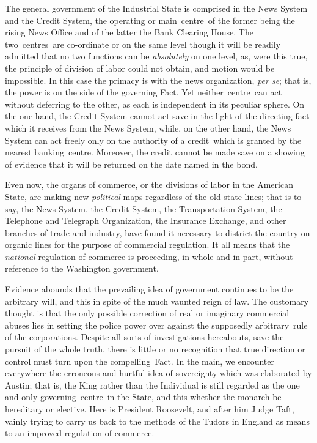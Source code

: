 \documentclass[twoside,symmetric,nobib,justified]{tufte-book}
\begin{document}
The general government of the Industrial State is comprised in the News
System and the Credit System, the operating or main~centre~of the former
being the rising News Office and of the latter the Bank Clearing House.
The two~centres~are co-ordinate or on the same level though it will be
readily admitted that no two functions can be \emph{absolutely} on one
level, as, were this true, the principle of division of labor could not
obtain, and motion would be impossible. In this case the primacy is with
the news organization, \emph{per se}; that is, the power is on the side
of the governing Fact. Yet neither~centre~can act without deferring to
the other, as each is independent in its peculiar sphere. On the one
hand, the Credit System cannot act save in the light of the directing
fact which it receives from the News System, while, on the other hand,
the News System can act freely only on the authority of a credit~which
is granted by the nearest banking~centre. Moreover, the credit cannot be
made save on a showing of evidence that it will be returned on the date
named in the bond.~

Even now, the organs of commerce, or the divisions of labor in the
American State, are making new \emph{political} maps regardless of the
old state lines; that is to say, the News System, the Credit System, the
Transportation System, the Telephone and Telegraph Organization, the
Insurance Exchange, and other branches of trade and industry, have found
it necessary to district the country on organic lines for the purpose of
commercial regulation. It all means that the \emph{national} regulation
of commerce is proceeding, in whole and in part, without reference to
the Washington government.~

Evidence abounds that the prevailing idea of government continues to be
the arbitrary will, and this in spite of the much vaunted reign of law.
The customary thought is that the only possible correction of real or
imaginary commercial abuses lies in setting the police power over
against the supposedly arbitrary~rule of the corporations. Despite all
sorts of investigations hereabouts, save the pursuit of the whole truth,
there is little or no recognition that true direction or control must
turn upon the compelling~Fact. In the main, we encounter everywhere the
erroneous and hurtful idea of sovereignty which was elaborated by
Austin; that is, the King rather than the Individual is still regarded
as the one and only governing~centre~in the State, and this whether the
monarch be hereditary or elective. Here is President Roosevelt, and
after him Judge Taft, vainly trying to carry us back to the methods of
the Tudors in England as means to an improved regulation of commerce.~
\end{document}
